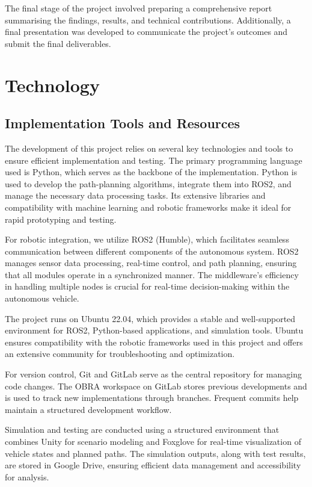 \documentclass[a4paper,11pt]{report}
\begin{document}
The final stage of the project involved preparing a comprehensive report summarising the findings, results, and technical contributions. Additionally, a final presentation was developed to communicate the project's outcomes and submit the final deliverables.




\chapter{Technology}
\section{Implementation Tools and Resources}
The development of this project relies on several key technologies and tools to ensure efficient implementation and testing. The primary programming language used is Python, which serves as the backbone of the implementation. Python is used to develop the path-planning algorithms, integrate them into ROS2, and manage the necessary data processing tasks. Its extensive libraries and compatibility with machine learning and robotic frameworks make it ideal for rapid prototyping and testing.

For robotic integration, we utilize ROS2 (Humble), which facilitates seamless communication between different components of the autonomous system. ROS2 manages sensor data processing, real-time control, and path planning, ensuring that all modules operate in a synchronized manner. The middleware's efficiency in handling multiple nodes is crucial for real-time decision-making within the autonomous vehicle.

The project runs on Ubuntu 22.04, which provides a stable and well-supported environment for ROS2, Python-based applications, and simulation tools. Ubuntu ensures compatibility with the robotic frameworks used in this project and offers an extensive community for troubleshooting and optimization.

For version control, Git and GitLab serve as the central repository for managing code changes. The OBRA workspace on GitLab stores previous developments and is used to track new implementations through branches. Frequent commits help maintain a structured development workflow.

Simulation and testing are conducted using a structured environment that combines Unity for scenario modeling and Foxglove for real-time visualization of vehicle states and planned paths. The simulation outputs, along with test results, are stored in Google Drive, ensuring efficient data management and accessibility for analysis.
\end{document}
